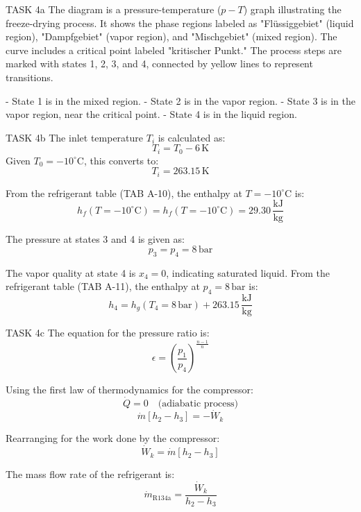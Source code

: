 TASK 4a  
The diagram is a pressure-temperature (\(p-T\)) graph illustrating the freeze-drying process. It shows the phase regions labeled as "Flüssiggebiet" (liquid region), "Dampfgebiet" (vapor region), and "Mischgebiet" (mixed region). The curve includes a critical point labeled "kritischer Punkt." The process steps are marked with states 1, 2, 3, and 4, connected by yellow lines to represent transitions.  

- State 1 is in the mixed region.  
- State 2 is in the vapor region.  
- State 3 is in the vapor region, near the critical point.  
- State 4 is in the liquid region.  

TASK 4b  
The inlet temperature \(T_i\) is calculated as:  
\[
T_i = T_0 - 6 \, \text{K}
\]  
Given \(T_0 = -10^\circ\text{C}\), this converts to:  
\[
T_i = 263.15 \, \text{K}
\]  

From the refrigerant table (TAB A-10), the enthalpy at \(T = -10^\circ\text{C}\) is:  
\[
h_f(T = -10^\circ\text{C}) = h_f(T = -10^\circ\text{C}) = 29.30 \, \frac{\text{kJ}}{\text{kg}}
\]  

The pressure at states 3 and 4 is given as:  
\[
p_3 = p_4 = 8 \, \text{bar}
\]  

The vapor quality at state 4 is \(x_4 = 0\), indicating saturated liquid. From the refrigerant table (TAB A-11), the enthalpy at \(p_4 = 8 \, \text{bar}\) is:  
\[
h_4 = h_g(T_4 = 8 \, \text{bar}) + 263.15 \, \frac{\text{kJ}}{\text{kg}}
\]  

TASK 4c  
The equation for the pressure ratio is:  
\[
\epsilon = \left( \frac{p_1}{p_4} \right)^{\frac{n-1}{n}}
\]  

Using the first law of thermodynamics for the compressor:  
\[
\dot{Q} = 0 \quad \text{(adiabatic process)}
\]  
\[
\dot{m} \left[ h_2 - h_3 \right] = -\dot{W}_k
\]  

Rearranging for the work done by the compressor:  
\[
\dot{W}_k = \dot{m} \left[ h_2 - h_3 \right]
\]  

The mass flow rate of the refrigerant is:  
\[
\dot{m}_{\text{R134a}} = \frac{\dot{W}_k}{h_2 - h_3}
\]